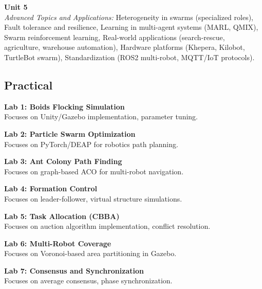 \vspace{0.3cm}

\noindent\textbf{Unit 5} \\
\textit{Advanced Topics and Applications:} Heterogeneity in swarms (specialized roles), Fault tolerance and resilience, Learning in multi-agent systems (MARL, QMIX), Swarm reinforcement learning, Real-world applications (search-rescue, agriculture, warehouse automation), Hardware platforms (Khepera, Kilobot, TurtleBot swarm), Standardization (ROS2 multi-robot, MQTT/IoT protocols).

\newpage

\subsection*{Practical}
\noindent\textbf{Lab 1: Boids Flocking Simulation} \\
Focuses on Unity/Gazebo implementation, parameter tuning.

\vspace{0.2cm}

\noindent\textbf{Lab 2: Particle Swarm Optimization} \\
Focuses on PyTorch/DEAP for robotics path planning.

\vspace{0.2cm}

\noindent\textbf{Lab 3: Ant Colony Path Finding} \\
Focuses on graph-based ACO for multi-robot navigation.

\vspace{0.2cm}

\noindent\textbf{Lab 4: Formation Control} \\
Focuses on leader-follower, virtual structure simulations.

\vspace{0.2cm}

\noindent\textbf{Lab 5: Task Allocation (CBBA)} \\
Focuses on auction algorithm implementation, conflict resolution.

\vspace{0.2cm}

\noindent\textbf{Lab 6: Multi-Robot Coverage} \\
Focuses on Voronoi-based area partitioning in Gazebo.

\vspace{0.2cm}

\noindent\textbf{Lab 7: Consensus and Synchronization} \\
Focuses on average consensus, phase synchronization.

